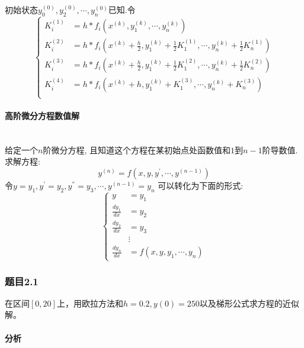 初始状态$y_0^{\left(0\right)}, y_2^{\left(0\right)}, \cdots, y_n^{\left(0\right)}$已知.令$$
\left\{
\begin{aligned}
K_{i}^{\left(1\right)} &= h * f_i\left(x^{\left(k\right)},y_1^{\left(k\right)},\cdots,y_n^{\left(k\right)}\right) \\
K_{i}^{\left(2\right)} &= h * f_i\left(x^{\left(k\right)} + \frac{h}{2}, y_1^{\left(k\right)} + \frac{1}{2}K_{1}^{\left(1\right)}, \cdots, y_n^{\left(k\right)} + \frac{1}{2}K_{n}^{\left(1\right)}\right) \\
K_{i}^{\left(3\right)} &= h * f_i\left(x^{\left(k\right)} + \frac{h}{2}, y_1^{\left(k\right)} + \frac{1}{2}K_{1}^{\left(2\right)}, \cdots, y_n^{\left(k\right)} + \frac{1}{2}K_{n}^{\left(2\right)}\right) \\
K_{i}^{\left(4\right)} &= h * f_i\left(x^{\left(k\right)} + h, y_1^{\left(k\right)} + K_{1}^{\left(3\right)}, \cdots, y_n^{\left(k\right)} + K_{n}^{\left(3\right)}\right) \\										
\end{aligned}
\right.$$

\paragraph{高阶微分方程数值解}
~\\
给定一个$n$阶微分方程, 且知道这个方程在某初始点处函数值和$1$到$n-1$阶导数值.求解方程:
$$y^{\left(n\right)} = f\left(x,y,y^{'},\cdots,y^{\left(n-1 \right)} \right)$$
令$y = y_1, y^{'} = y_2, y^{''} = y_3, \cdots, y^{\left(n-1\right)} = y_{n}$
可以转化为下面的形式:
$$\left\{
\begin{aligned}
y &= y_1 \\
\frac{dy_1}{dx} &= y_2 \\
\frac{dy_2}{dx} &= y_3 \\
&\vdots \\ 
\frac{dy_{n}}{dx} &= f\left(x,y,y_1,\cdots,y_{n}\right)
\end{aligned}
\right.$$

\pagebreak

\subsubsection{题目2.1}

在区间$[0,20]$上，用欧拉方法和$h=0.2,y(0)=250$以及梯形公式求方程的近似解。

\paragraph{分析}

